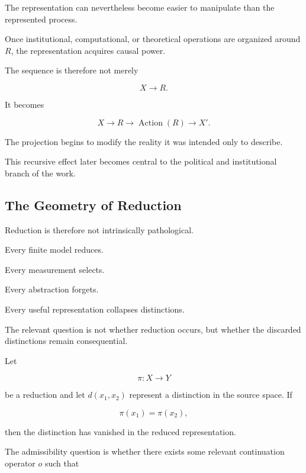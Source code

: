 \documentclass[11pt]{article}
\theoremstyle{remark}
\begin{document}
The representation can nevertheless become easier to manipulate than the represented process.

Once institutional, computational, or theoretical operations are organized around $R$, the representation acquires causal power.

The sequence is therefore not merely

\begin{equation}
X\rightarrow R.
\end{equation}

It becomes

\begin{equation}
X
\rightarrow
R
\rightarrow
\operatorname{Action}(R)
\rightarrow
X'.
\end{equation}

The projection begins to modify the reality it was intended only to describe.

This recursive effect later becomes central to the political and institutional branch of the work.

\subsection{The Geometry of Reduction}

Reduction is therefore not intrinsically pathological.

Every finite model reduces.

Every measurement selects.

Every abstraction forgets.

Every useful representation collapses distinctions.

The relevant question is not whether reduction occurs, but whether the discarded distinctions remain consequential.

Let

\begin{equation}
\pi:X\rightarrow Y
\end{equation}

be a reduction and let $d(x_1,x_2)$ represent a distinction in the source space. If

\begin{equation}
\pi(x_1)=\pi(x_2),
\end{equation}

then the distinction has vanished in the reduced representation.

The admissibility question is whether there exists some relevant continuation operator $o$ such that
\end{document}
